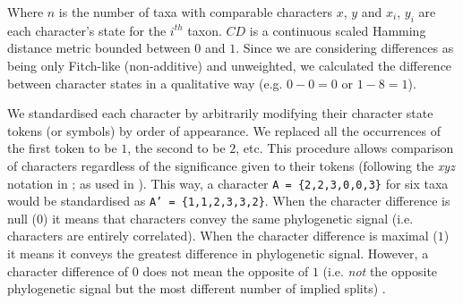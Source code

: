 \documentclass[12pt,letterpaper]{article}
\begin{document}
\noindent Where $n$ is the number of taxa with comparable characters $x$, $y$ and $x_i$, $y_i$ are each character's state for the $i^{th}$ taxon.
$CD$ is a continuous scaled Hamming distance metric bounded between $0$ and $1$.
Since we are considering differences as being only Fitch-like (non-additive) and unweighted, we calculated the difference between character states in a qualitative way %
(e.g. $0 - 0 = 0$ or $1 - 8 = 1$).

We standardised each character by arbitrarily modifying their character state tokens (or symbols) by order of appearance.
We replaced all the occurrences of the first token to be $1$, the second to be $2$, etc.
This procedure allows comparison of characters regardless of the significance given to their tokens (following the \textit{xyz} notation in \citealt{felsenstein2004inferring}; as used in \citealt{Davalos01072014}).
This way, a character \texttt{A = \{2,2,3,0,0,3\}} for six taxa would be standardised as \texttt{A' = \{1,1,2,3,3,2\}}.
When the character difference is null ($0$) it means that characters convey the same phylogenetic signal (i.e. characters are entirely correlated).
When the character difference is maximal ($1$) it means it conveys the greatest difference in phylogenetic signal. %
However, a character difference of $0$ %
does not mean the opposite of $1$ (i.e. \textit{not} the opposite phylogenetic signal but the most different number of implied splits) .
\end{document}
